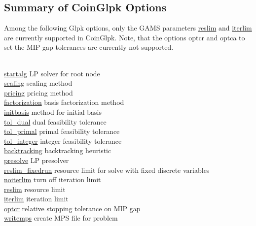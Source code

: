 \subsection{Summary of CoinGlpk Options}

Among the following Glpk options, only the GAMS parameters \hyperlink{glpkreslim}{reslim} and \hyperlink{glpkiterlim}{iterlim} are currently supported in CoinGlpk.
Note, that the options optcr and optca to set the MIP gap tolerances are currently not supported.

\begin{tabbing}
\hspace {1.0in} \= \\
\hyperlink{glpkstartalg}
{startalg} \> LP solver for root node \\
\hyperlink{glpkscaling}
{scaling} \> scaling method \\
\hyperlink{pricing}
{pricing} \> pricing method \\
\hyperlink{factorization}
{factorization} \> basis factorization method \\
\hyperlink{initbasis}
{initbasis} \> method for initial basis \\
\hyperlink{glpktol_dual}
{tol\_dual} \> dual feasibility tolerance \\
\hyperlink{glpktol_primal}
{tol\_primal} \> primal feasibility tolerance \\
\hyperlink{glpktol_integer}
{tol\_integer} \> integer feasibility tolerance \\
\hyperlink{backtracking}
{backtracking} \> backtracking heuristic \\
\hyperlink{glpkpresolve}
{presolve} \> LP presolver \\
\hyperlink{reslim_fixedrun}
{reslim\_fixedrun} \> resource limit for solve with fixed discrete variables \\
\hyperlink{noiterlim}
{noiterlim} \> turn off iteration limit \\
\hyperlink{glpkreslim}
{reslim} \> resource limit \\
\hyperlink{glpkiterlim}
{iterlim} \> iteration limit \\
\hyperlink{glpkoptcr}
{optcr} \> relative stopping tolerance on MIP gap \\
\hyperlink{glpkwritemps}
{writemps} \> create MPS file for problem \\
\end{tabbing}

